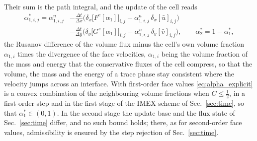\documentclass[a4paper,fleqn]{cas-sc}
\begin{document}
Their sum is the path integral, and the update of the cell reads
\begin{equation}
\begin{aligned}
\alpha^*_{1,i,j}=\alpha^n_{1,i,j}&-\frac{\Delta t}{\Delta x}\Big(\delta_x\big[F^e[\alpha_1]\big]_{i,j}-\alpha^n_{1,i,j}\,\delta_x[\bar u]_{i,j}\Big)\\
&-\frac{\Delta t}{\Delta y}\Big(\delta_y\big[G^e[\alpha_1]\big]_{i,j}-\alpha^n_{1,i,j}\,\delta_y[\bar v]_{i,j}\Big),\qquad
\alpha^*_2=1-\alpha^*_1 ,
\end{aligned}
\label{eq:alpha_explicit}
\end{equation}
the Rusanov difference of the volume flux minus the cell's own volume fraction $\alpha_{1,i}$ times the divergence of the face
velocities, $\alpha_{1,i}$ being the volume fraction of the mass and energy that the conservative fluxes of the cell compress, so that the volume, the mass and the energy of a
trace phase stay consistent where the velocity jumps across an interface. With first-order face values \eqref{eq:alpha_explicit} is a convex combination of the neighbouring volume
fractions when $C\le\tfrac12$, in a first-order step and in the first stage of the IMEX scheme of Sec.~\ref{sec:time}, so that
$\alpha^*_1\in(0,1)$. In the second stage the update base and the flux state of Sec.~\ref{sec:time} differ, and no
such bound holds; there, as for second-order face values, admissibility is ensured by the step rejection of Sec.~\ref{sec:time}.
\end{document}
